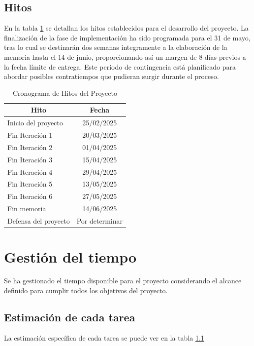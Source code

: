\subsection{Hitos}\label{sec:hitos}

En la tabla \ref{tab:hitos} se detallan los hitos establecidos para el desarrollo del proyecto. La finalización de la fase de implementación ha sido programada para el 31 de mayo, tras lo cual se destinarán dos semanas íntegramente a la elaboración de la memoria hasta el 14 de junio, proporcionando así un margen de 8 días previos a la fecha límite de entrega. Este período de contingencia está planificado para abordar posibles contratiempos que pudieran surgir durante el proceso.


\begin{table}[H]\centering
\begin{tabular}{|l|c|}
\hline
\multicolumn{1}{|c|}{\textbf{Hito}} & \multicolumn{1}{c|}{\textbf{Fecha}} \\
\hline
Inicio del proyecto & 25/02/2025 \\
\hline
Fin Iteración 1 & 20/03/2025 \\
\hline
Fin Iteración 2 & 01/04/2025 \\
\hline
Fin Iteración 3 & 15/04/2025 \\
\hline
Fin Iteración 4 & 29/04/2025 \\
\hline
Fin Iteración 5 & 13/05/2025 \\
\hline
Fin Iteración 6 & 27/05/2025 \\
\hline
Fin memoria & 14/06/2025 \\
\hline
Defensa del proyecto & Por determinar \\
\hline
\end{tabular}
\caption{Cronograma de Hitos del Proyecto}
\label{tab:hitos}
\end{table}

\section{Gestión del tiempo}
Se ha gestionado el tiempo disponible para el proyecto considerando el alcance definido para cumplir todos los objetivos del proyecto. 

\subsection{Estimación de cada tarea}
La estimación específica de cada tarea se puede ver en la tabla \ref{}

